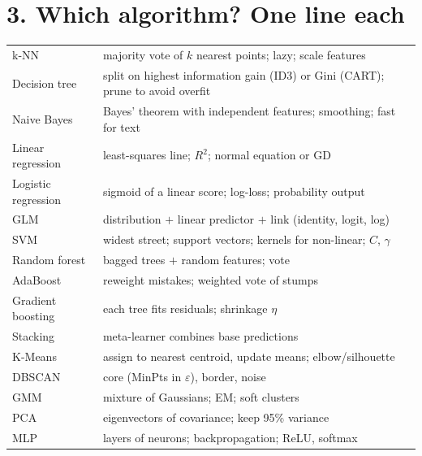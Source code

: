 \section*{3. Which algorithm? One line each}
\begin{center}
\small
\begin{tabular}{@{}p{3.4cm}p{13.2cm}@{}}
\toprule
k-NN & majority vote of $k$ nearest points; lazy; scale features\\
Decision tree & split on highest information gain (ID3) or Gini (CART); prune to avoid overfit\\
Naive Bayes & Bayes' theorem with independent features; smoothing; fast for text\\
Linear regression & least-squares line; $R^2$; normal equation or GD\\
Logistic regression & sigmoid of a linear score; log-loss; probability output\\
GLM & distribution $+$ linear predictor $+$ link (identity, logit, log)\\
SVM & widest street; support vectors; kernels for non-linear; $C$, $\gamma$\\
Random forest & bagged trees $+$ random features; vote\\
AdaBoost & reweight mistakes; weighted vote of stumps\\
Gradient boosting & each tree fits residuals; shrinkage $\eta$\\
Stacking & meta-learner combines base predictions\\
K-Means & assign to nearest centroid, update means; elbow/silhouette\\
DBSCAN & core (MinPts in $\varepsilon$), border, noise\\
GMM & mixture of Gaussians; EM; soft clusters\\
PCA & eigenvectors of covariance; keep 95\% variance\\
MLP & layers of neurons; backpropagation; ReLU, softmax\\
\bottomrule
\end{tabular}
\end{center}

